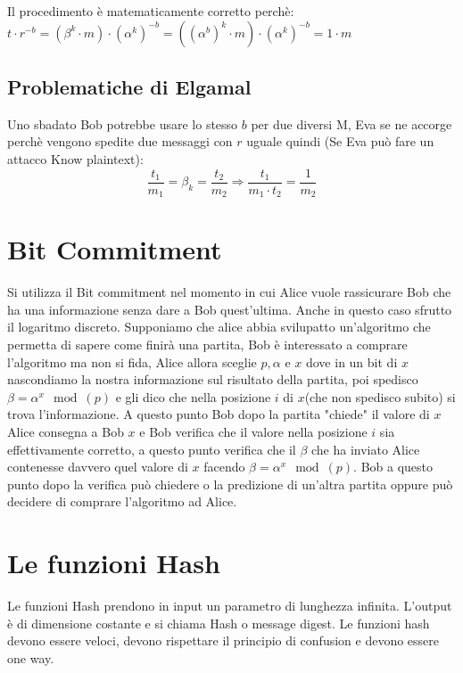 \documentclass[10pt,a4paper]{article}
\begin{document}
Il procedimento è matematicamente corretto perchè:\\
$t\cdot r^{-b}=(\beta^k\cdot m)\cdot(\alpha^k)^{-b}=((\alpha^b)^{k}\cdot m)\cdot(\alpha^k)^{-b} = 1 \cdot m$

\subsection{Problematiche di Elgamal}
Uno sbadato Bob potrebbe usare lo stesso $b$ per due diversi M, Eva se ne accorge perchè vengono spedite due messaggi con $r$ uguale quindi (Se Eva può fare un attacco Know plaintext):
$$ \frac{t_1}{m_1}=\beta_k=\frac{t_2}{m_2} \Rightarrow \frac{t_1}{m_1\cdot t_2} = \frac{1}{m_2} $$

\section{Bit Commitment}
Si utilizza il Bit commitment nel momento in cui Alice vuole rassicurare Bob che ha una informazione senza dare a Bob quest'ultima. Anche in questo caso sfrutto il logaritmo discreto. Supponiamo che alice abbia svilupatto un'algoritmo che permetta di sapere come finirà una partita, Bob è interessato a comprare l'algoritmo ma non si fida, Alice allora sceglie $p,\alpha$ e $x$ dove in un bit di $x$ nascondiamo la nostra informazione sul risultato della partita, poi spedisco $\beta = \alpha^x \mod(p)$ e gli dico che nella posizione $i$ di $x$(che non spedisco subito) si trova l'informazione. A questo punto Bob dopo la partita "chiede" il valore di $x$ Alice consegna a Bob $x$ e Bob verifica che il valore nella posizione $i$ sia effettivamente corretto, a questo punto verifica che il $\beta$ che ha inviato Alice contenesse davvero quel valore di $x$ facendo $\beta = \alpha^x \mod(p)$. Bob a questo punto dopo la verifica può chiedere o la predizione di un'altra partita oppure può decidere di comprare l'algoritmo ad Alice.

\section{Le funzioni Hash}
Le funzioni Hash prendono in input un parametro di lunghezza infinita. L'output è di dimensione costante e si chiama Hash o message digest. Le funzioni hash devono essere veloci, devono rispettare il principio di confusion e devono essere one way.
\end{document}
